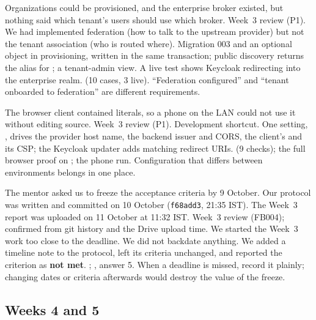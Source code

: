 {Organizations could be provisioned, and the enterprise broker existed, but nothing said which tenant's users should use which broker.}
{Week~3 review (P1).}
{We had implemented federation (how to talk to the upstream provider) but not the tenant association (who is routed where).}
{Migration 003 and an optional  object in provisioning, written in the same transaction; public discovery returns the alias for ; a tenant-admin view. A live test shows Keycloak redirecting into the enterprise realm.}
{ (10 cases, 3 live).}
{``Federation configured'' and ``tenant onboarded to federation'' are different requirements.}

{The browser client contained  literals, so a phone on the LAN could not use it without editing source.}
{Week~3 review (P1).}
{Development shortcut.}
{One setting, , drives the provider host name, the backend issuer and CORS, the client's  and its CSP; the Keycloak updater adds matching redirect URIs.}
{ (9 checks); the full browser proof on ; the phone run.}
{Configuration that differs between environments belongs in one place.}

{The mentor asked us to freeze the acceptance criteria by 9 October. Our protocol was written and committed on 10 October (\texttt{f68add3}, 21:35 IST). The Week~3 report was uploaded on 11 October at 11:32 IST.}
{Week~3 review (FB004); confirmed from git history and the Drive upload time.}
{We started the Week~3 work too close to the deadline.}
{We did not backdate anything. We added a timeline note to the protocol, left its criteria unchanged, and reported the criterion as \textbf{not met}.}
{; , answer 5.}
{When a deadline is missed, record it plainly; changing dates or criteria afterwards would destroy the value of the freeze.}

\subsection{Weeks 4 and 5}

